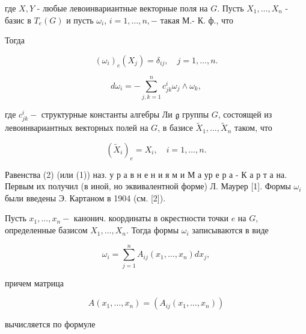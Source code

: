 \documentclass[10pt]{article}
\begin{document}
где $X, Y$ - любые левоинвариантные векторные поля на $G$. Пусть $X_{1}, \ldots, X_{n}$ - базис в $T_{e}(G)$ и пусть $\omega_{i}$, $i=1, \ldots, n,-$ такая М.- К. ф., что



Тогда



\[

\left(\omega_{i}\right)_{e}\left(X_{j}\right)=\delta_{i j}, \quad j=1, \ldots, n .

\]



\[

d \omega_{i}=-\sum_{j, k=1}^{n} c_{j k}^{i} \omega_{j} \wedge \omega_{k},

\]



где $c_{j k}^{i}-$ структурные константы алгебры Ли $\mathfrak{g}$ группы $G$, состоящей из левоинвариантных векторных полей на $G$, в базисе $\tilde{X}_{1}, \ldots, \tilde{X}_{n}$ таком, что



\[

\left(\tilde{X}_{i}\right)_{e}=X_{i}, \quad i=1, \ldots, n .

\]



Равенства (2) (или (1)) наз. у р а в н е н и я м и М а ур е р а - К а р т а на. Первым их получил (в иной, но эквивалентной форме) Л. Маурер [1]. Формы $\omega_{i}$ были введены Э. Картаном в 1904 (см. [2]).



Пусть $x_{1}, \ldots, x_{n}-$ канонич. координаты в окрестности точки $e$ на $G$, определенные базисом $X_{1}, \ldots, X_{n}$. Тогда формы $\omega_{i}$ записываются в виде



\[

\omega_{i}=\sum_{j=1}^{n} A_{i j}\left(x_{1}, \ldots, x_{n}\right) d x_{j},

\]



причем матрица



\[

A\left(x_{1}, \ldots, x_{n}\right)=\left(A_{i j}\left(x_{1}, \ldots, x_{n}\right)\right)

\]



вычисляется по формуле
\end{document}
